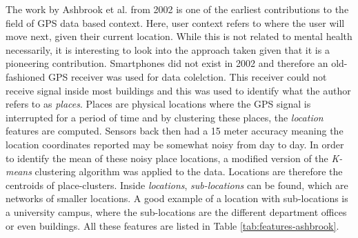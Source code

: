 The work by Ashbrook et al. \cite{learning_significant_locations} from 2002 is one of the earliest contributions to the field of GPS data based context. Here, user context refers to where the user will move next, given their current location. While this is not related to mental health necessarily, it is interesting to look into the approach taken given that it is a pioneering contribution. Smartphones did not exist in 2002 and therefore an old-fashioned GPS receiver was used for data colelction. This receiver could not receive signal inside most buildings and this was used to identify what the author refers to as \textit{places}. Places are physical locations where the GPS signal is interrupted for a period of time and by clustering these places, the \textit{location} features are computed. Sensors back then had a 15 meter accuracy meaning the location coordinates reported may be somewhat noisy from day to day. In order to identify the mean of these noisy place locations, a modified version of the \textit{K-means} clustering algorithm was applied to the data. Locations are therefore the centroids of place-clusters. Inside \textit{locations}, \textit{sub-locations} can be found, which are networks of smaller locations. A good example of a location with sub-locations is a university campus, where the sub-locations are the different department offices or even buildings. All these features are listed in Table \ref{tab:features-ashbrook}. 


